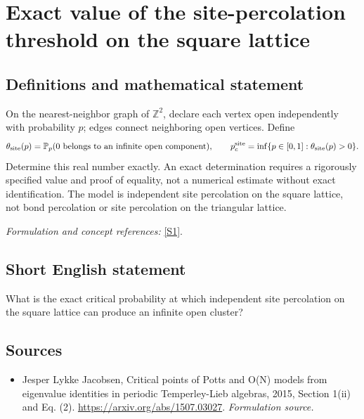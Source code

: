 \documentclass[11pt]{article}
\begin{document}
\section*{\texorpdfstring{Exact value of the site-percolation threshold on the square lattice}{Exact value of the site-percolation threshold on the square lattice}}\label{433}
\subsection{Definitions and mathematical statement}
On the nearest-neighbor graph of ${\mathbb{Z}}^2$, declare each vertex open independently with probability $p$; edges connect neighboring open vertices. Define
\[
 \theta_{\rm site}(p)={\mathbb{P}}_p(0\text{ belongs to an infinite open component}),
 \qquad
 p_c^{\rm site}=\inf\{p\in[0,1]:\theta_{\rm site}(p)>0\}.
\]
Determine this real number exactly. An exact determination requires a rigorously specified value and proof of equality, not a numerical estimate without exact identification. The model is independent site percolation on the square lattice, not bond percolation or site percolation on the triangular lattice.
\par\smallskip\textit{Formulation and concept references:} \href{https://arxiv.org/abs/1507.03027}{[S1]}.

\subsection{Short English statement}
What is the exact critical probability at which independent site percolation on the square lattice can produce an infinite open cluster?
\subsection{Sources}
\begin{itemize}
\item[S1]Jesper Lykke Jacobsen, Critical points of Potts and O(N) models from eigenvalue identities in periodic Temperley-Lieb algebras, 2015, Section 1(ii) and Eq. (2).
\url{https://arxiv.org/abs/1507.03027}.
\textit{Formulation source.}
\end{itemize}
\end{document}
